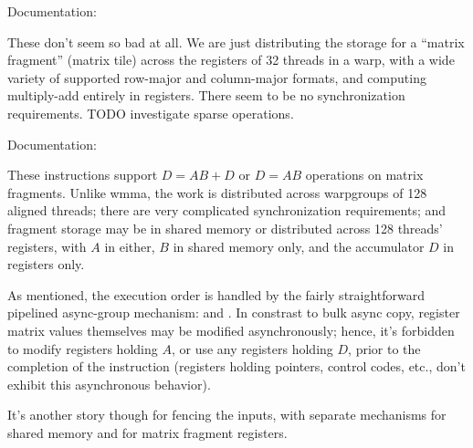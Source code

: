 \filbreak
{}

Documentation: 

These don't seem so bad at all. We are just distributing the storage for a ``matrix fragment'' (matrix tile) across the registers of 32 threads in a warp, with a wide variety of supported row-major and column-major formats, and computing multiply-add entirely in registers. There seem to be no synchronization requirements. TODO investigate sparse operations.

\filbreak
{}

Documentation: 

These  instructions support $D = AB + D$ or $D = AB$ operations on matrix fragments. Unlike wmma, the work is distributed across warpgroups of 128 aligned threads; there are very complicated synchronization requirements; and fragment storage may be in shared memory or distributed across 128 threads' registers, with $A$ in either, $B$ in shared memory only, and the accumulator $D$ in registers only.

\filbreak
As mentioned, the execution order is handled by the fairly straightforward pipelined async-group mechanism:  and .
In constrast to bulk async copy, register matrix values themselves may be modified asynchronously; hence, it's forbidden to modify registers holding $A$, or use any registers holding $D$, prior to the completion of the instruction (registers holding pointers, control codes, etc., don't exhibit this asynchronous behavior).

\filbreak
It's another story though for fencing the inputs, with separate mechanisms for shared memory and for matrix fragment registers.

